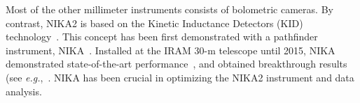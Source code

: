 Most of the other millimeter instruments consists of bolometric cameras. By contrast,
NIKA2 is based on the Kinetic Inductance Detectors (KID)
technology~\citep{Day2003, Doyle2008_LEKID, Shu2018_LEKID}. This concept has been
first demonstrated with a pathfinder instrument,
NIKA~\citep{Monfardini2010_NIKA, Monfardini2011_NIKA}.
Installed at the IRAM 30-m telescope until 2015, NIKA demonstrated
state-of-the-art performance~\citep{Catalano2014}, and obtained
breakthrough results
(see \emph{e.g.},~\citet{Adam2014, Adam2017_kSZ}.
NIKA has been crucial in optimizing the NIKA2 instrument and data
analysis. 

%

